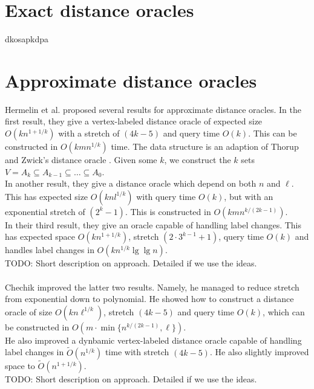 \section{Exact distance oracles}
dkosapkdpa

\section{Approximate distance oracles}
Hermelin et al. \cite{hermelin2011distance} proposed several results for approximate
distance oracles. In the first result, they give a vertex-labeled distance oracle of
expected size $O(kn^{1+1/k})$ with a stretch of $(4k-5)$ and query time $O(k)$. This can
be constructed in $O(kmn^{1/k})$ time. The data structure is an adaption of Thorup and
Zwick's distance oracle \cite{thorup2005approximate}. Given some $k$, we construct the
$k$ sets $V=A_{k}\subseteq A_{k-1} \subseteq \dots \subseteq A_0$. \\
In another result, they give a distance oracle which depend on both $n$ and $\ell$. This has
expected size $O(knl^{1/k})$ with query time $O(k)$, but with an exponential stretch of
$(2^k-1)$. This is constructed in $O(kmn^{k/(2k-1)})$. \\
In their third result, they give an oracle capable of handling label changes. This has
expected space $O(kn^{1+1/k})$, stretch $(2\cdot3^{k-1}+1)$, query time $O(k)$ and
handles label changes in $O(kn^{1/k}\lg \lg n)$. \\
TODO: Short description on approach. Detailed if we use the ideas. \\
\\
Chechik \cite{chechik2012improved} improved the latter two results. Namely, he managed to
reduce stretch from exponential down to polynomial. He showed how to construct a distance oracle
of size $O(kn\ell^{1/k})$, stretch $(4k-5)$  and query time $O(k)$, which can be
constructed in $O(m\cdot \min\{n^{k/(2k-1)}, \ell\})$. \\
He also improved a dynbamic vertex-labeled distance oracle capable of handling label changes in
$\tilde{O}(n^{1/k})$ time with stretch $(4k-5)$. He also slightly improved space to
$\tilde{O}(n^{1+1/k})$. \\
TODO: Short description on approach. Detailed if we use the ideas.
